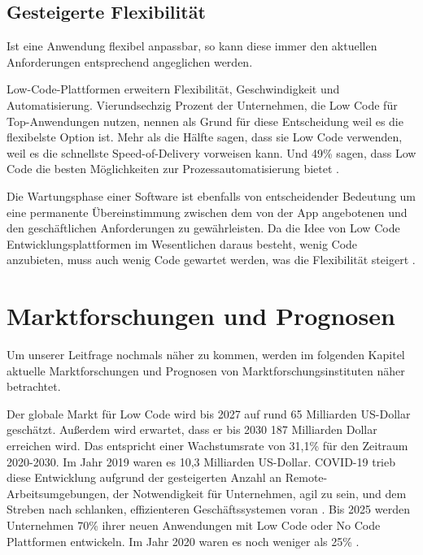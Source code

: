 \documentclass[12pt]{article} %
\begin{document}
	\subsection{Gesteigerte Flexibilität}
	Ist eine Anwendung flexibel anpassbar, so kann diese immer den aktuellen Anforderungen entsprechend angeglichen werden.
	
	Low-Code-Plattformen erweitern Flexibilität, Geschwindigkeit und Automatisierung. Vierundsechzig Prozent der Unternehmen, die Low Code für Top-Anwendungen nutzen, nennen als Grund für diese Entscheidung weil es die flexibelste Option ist. 
	Mehr als die Hälfte sagen, dass sie Low Code verwenden, weil es die schnellste Speed-of-Delivery vorweisen kann. Und 49\% sagen, dass Low Code die besten Möglichkeiten zur Prozessautomatisierung bietet \autocite{EmmaVanPelt.2019}. \newline
	
	Die Wartungsphase einer Software ist ebenfalls von entscheidender Bedeutung um eine permanente Übereinstimmung zwischen dem von der App angebotenen und den geschäftlichen Anforderungen zu gewährleisten. Da die Idee von Low Code Entwicklungsplattformen im Wesentlichen daraus besteht, wenig Code anzubieten, muss auch wenig Code gewartet werden, was die Flexibilität steigert \autocite{Sanchis.2020b}.


	
	\section{Marktforschungen und Prognosen} \label{Zukunftsaussicht}
	Um unserer Leitfrage nochmals näher zu kommen, werden im folgenden Kapitel aktuelle Marktforschungen und Prognosen von Marktforschungsinstituten näher betrachtet. \newline

	Der globale Markt für Low Code wird bis 2027 auf rund 65 Milliarden US-Dollar geschätzt. Außerdem wird erwartet, dass er bis 2030 187 Milliarden Dollar erreichen wird. Das entspricht einer Wachstumsrate von 31,1\% für den Zeitraum 2020-2030.
	Im Jahr 2019 waren es 10,3 Milliarden US-Dollar. COVID-19 trieb diese Entwicklung aufgrund der gesteigerten Anzahl an Remote-Arbeitsumgebungen, der Notwendigkeit für Unternehmen, agil zu sein, und dem Streben nach schlanken, effizienteren Geschäftssystemen voran \autocite{KevinShuler.2023}.
	Bis 2025 werden Unternehmen 70\% ihrer neuen Anwendungen mit Low Code oder No Code Plattformen entwickeln. Im Jahr 2020 waren es noch weniger als 25\% \autocite{KevinShuler.2023}. \newline
	
\end{document}
